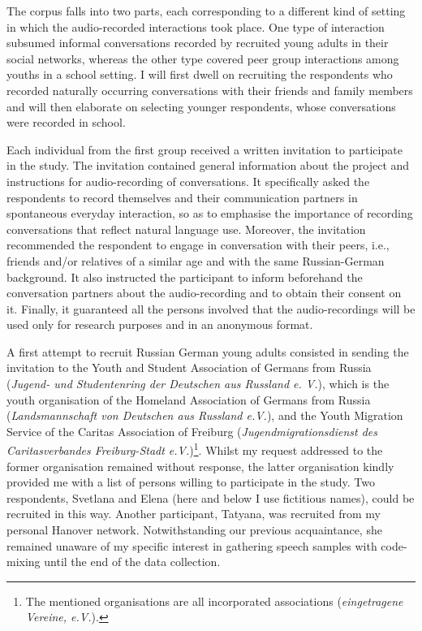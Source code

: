 The corpus falls into two parts, each corresponding to a different kind of setting in which the audio-recorded interactions took place. One type of interaction subsumed informal conversations recorded by recruited young adults in their social networks, whereas the other type covered peer group interactions among youths in a school setting. I will first dwell on recruiting the respondents who recorded naturally occurring conversations with their friends and family members and will then elaborate on selecting younger respondents, whose conversations were recorded in school.

Each individual from the first group received a written invitation to participate in the study. The invitation contained general information about the project and instructions for audio-recording of conversations. It specifically asked the respondents to record themselves and their communication partners in spontaneous everyday interaction, so as to emphasise the importance of recording conversations that reflect natural language use. Moreover, the invitation recommended the respondent to engage in conversation with their peers, i.e., friends and/or relatives of a similar age and with the same Russian-German background. It also instructed the participant to inform beforehand the conversation partners about the audio-recording and to obtain their consent on it. Finally, it guaranteed all the persons involved that the audio-recordings will be used only for research purposes and in an anonymous format.

A first attempt to recruit Russian German young adults consisted in sending the invitation to the Youth and Student Association of Germans from Russia (\textit{Jugend- und Studentenring der Deutschen aus Russland e. V.}), which is the youth organisation of the Homeland Association of Germans from Russia (\textit{Landsmannschaft von Deutschen aus Russland e.V.}), and the Youth Migration Service of the Caritas Association of Freiburg (\textit{Jugendmigrationsdienst des Caritasverbandes Freiburg-Stadt e.V.})\footnote{The mentioned organisations are all incorporated associations (\textit{eingetragene Vereine, e.V.}).}. Whilst my request addressed to the former organisation remained without response, the latter organisation kindly provided me with a list of persons willing to participate in the study. Two respondents, Svetlana and Elena (here and below I use fictitious names), could be recruited in this way. Another participant, Tatyana, was recruited from my personal Hanover network. Notwithstanding our previous acquaintance, she remained unaware of my specific interest in gathering speech samples with code-mixing until the end of the data collection.

